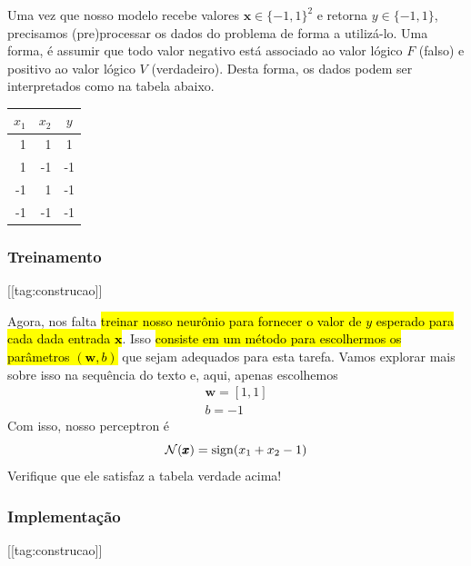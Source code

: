Uma vez que nosso modelo recebe valores $\pmb{x}\in \{-1,1\}^2$ e retorna $y\in\{-1,1\}$, precisamos (pre)processar os dados do problema de forma a utilizá-lo. Uma forma, é assumir que todo valor negativo está associado ao valor lógico $F$ (falso) e positivo ao valor lógico $V$ (verdadeiro). Desta forma, os dados podem ser interpretados como na tabela abaixo.

\begin{center}
  \begin{tabular}{rr|c}
    $x_1$ & $x_2$ & $y$\\\hline
    1 & 1 & 1\\
    1 & -1 & -1\\
    -1 & 1 & -1\\
    -1 & -1 & -1\\\hline
  \end{tabular}
\end{center}
    
    
\subsubsection{Treinamento}
[[tag:construcao]]

Agora, nos falta \hl{treinar nosso neurônio para fornecer o valor de $y$ esperado para cada dada entrada $\pmb{x}$}. Isso \hl{consiste em um método para escolhermos os parâmetros $(\pmb{w},b)$} que sejam adequados para esta tarefa. Vamos explorar mais sobre isso na sequência do texto e, aqui, apenas escolhemos
\begin{gather}
  \pmb{w} = [1, 1]\\
  b = -1
\end{gather}
Com isso, nosso perceptron é
\begin{equation}
  \mathcal{N}(\pmb{x}) = \operatorname{sign}(x_1 + x_2 - 1)
\end{equation}
Verifique que ele satisfaz a tabela verdade acima!


\subsubsection{Implementação}
[[tag:construcao]]

